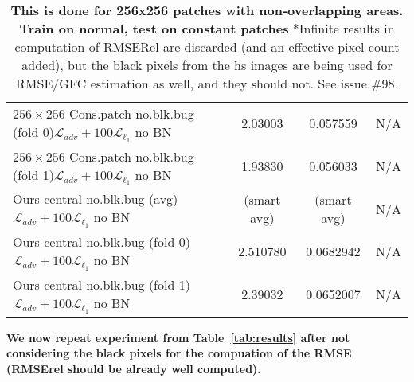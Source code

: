 \documentclass{bmvc2k}
\begin{document}
\begin{table}
\begin{center}
\begin{tabular}{|l|ccc|}
			$256\times256$ Cons.patch no.blk.bug (fold 0)$\mathcal{L}_{adv} + 100\mathcal{L}_{\ell_1}$ no BN & 2.03003 & 0.057559 & N/A\\
			$256\times256$ Cons.patch no.blk.bug (fold 1)$\mathcal{L}_{adv} + 100\mathcal{L}_{\ell_1}$ no BN & 1.93830 & 0.056033 & N/A\\ 				\hline       
			Ours central no.blk.bug (avg) $\mathcal{L}_{adv} + 100\mathcal{L}_{\ell_1}$ no BN & (smart avg) & (smart avg) & N/A\\
			Ours central no.blk.bug (fold 0)$\mathcal{L}_{adv} + 100\mathcal{L}_{\ell_1}$ no BN & 2.510780 & 0.0682942 & N/A\\
   			Ours central no.blk.bug (fold 1)$\mathcal{L}_{adv} + 100\mathcal{L}_{\ell_1}$ no BN & 2.39032 & 0.0652007 & N/A\\
            \hline
		\end{tabular}
	\end{center}
	\caption{\textbf{This is done for 256x256 patches with non-overlapping areas. Train on normal, test on constant patches} *Infinite results in computation of RMSERel are discarded (and an effective pixel count added), but the black pixels from the hs images are being used for RMSE/GFC estimation as well, and they should not. See issue \#98.}
    \label{tab:results_spatial_info}
\end{table}


\textbf{
We now repeat experiment from Table~\ref{tab:results} after not considering the black pixels for the compuation of the RMSE (RMSErel should be already well computed).
}
\end{document}
